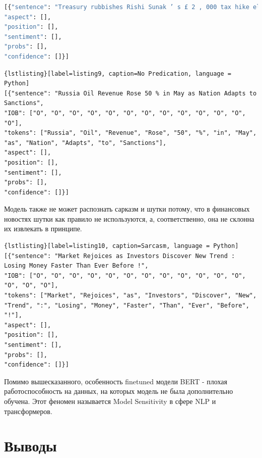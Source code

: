 \begin{lstlisting}[label=listing8, caption=No Predication, language = Python]
[{"sentence": "Treasury rubbishes Rishi Sunak ’ s £ 2 , 000 tax hike election TV debate claim", "IOB": ["O", "O", "O", "O", "O", "O", "O", "O", "O", "O", "O", "O", "O", "O", "O", "O"], "tokens": ["Treasury", "rubbishes", "Rishi", "Sunak", "’", "s", "£", "2", ",", "000", "tax", "hike", "election", "TV", "debate", "claim"], 
"aspect": [], 
"position": [], 
"sentiment": [], 
"probs": [], 
"confidence": []}]
\end{lstlisting}
\begin{lstlisting}{lstlisting}[label=listing9, caption=No Predication, language = Python]
[{"sentence": "Russia Oil Revenue Rose 50 % in May as Nation Adapts to Sanctions", 
"IOB": ["O", "O", "O", "O", "O", "O", "O", "O", "O", "O", "O", "O", "O"], 
"tokens": ["Russia", "Oil", "Revenue", "Rose", "50", "%", "in", "May", "as", "Nation", "Adapts", "to", "Sanctions"], 
"aspect": [], 
"position": [], 
"sentiment": [], 
"probs": [], 
"confidence": []}]
\end{lstlisting}

Модель также не может распознать сарказм и шутки потому, что в финансовых новостях шутки как правило не используются, а, соответственно, она не склонна их извлекать в принципе.
\vfill
\begin{lstlisting}{lstlisting}[label=listing10, caption=Sarcasm, language = Python]
[{"sentence": "Market Rejoices as Investors Discover New Trend : Losing Money Faster Than Ever Before !", 
"IOB": ["O", "O", "O", "O", "O", "O", "O", "O", "O", "O", "O", "O", "O", "O", "O"], 
"tokens": ["Market", "Rejoices", "as", "Investors", "Discover", "New", "Trend", ":", "Losing", "Money", "Faster", "Than", "Ever", "Before", "!"], 
"aspect": [],
"position": [],
"sentiment": [], 
"probs": [], 
"confidence": []}]
\end{lstlisting}

Помимо вышесказанного, особенность fine\textunderscore tuned модели BERT - плохая работоспособность на данных, на которых модель не была дополнительно обучена. Этот феномен называется Model Sensitivity в сфере NLP и трансформеров. 

\section{Выводы}

